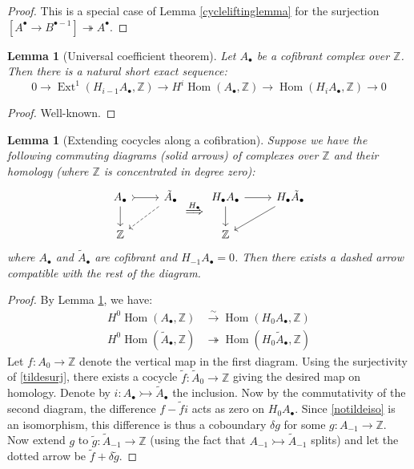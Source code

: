 \documentclass[12pt]{article}
\newtheorem{lemma}[theorem]{Lemma}
\theoremstyle{definition}
\theoremstyle{remark}
\numberwithin{equation}{subsection}
\newcommand{\ZZ}{\mathbb Z}
\newcommand{\Hom}{\operatorname{Hom}}
\newcommand{\Ext}{\operatorname{Ext}}
\begin{document}
\begin{proof}
This is a special case of Lemma \ref{cycleliftinglemma} for the surjection $[A^\bullet\to B^{\bullet-1}]\twoheadrightarrow A^\bullet$.
\end{proof}

\begin{lemma}[Universal coefficient theorem]\label{universalcoefficient}
Let $A_\bullet$ be a cofibrant complex over $\ZZ$.  Then there is a natural short exact sequence:
\begin{equation}
0\to\Ext^1(H_{i-1}A_\bullet,\ZZ)\to H^i\Hom(A_\bullet,\ZZ)\to\Hom(H_iA_\bullet,\ZZ)\to 0
\end{equation}
\end{lemma}

\begin{proof}
Well-known.
\end{proof}

\begin{lemma}[Extending cocycles along a cofibration]\label{cocycleextendinglemma}
Suppose we have the following commuting diagrams (solid arrows) of complexes over $\ZZ$ and their homology (where $\ZZ$ is concentrated in degree zero):
\begin{equation}
\begin{tikzcd}
A_\bullet\ar[tail]{r}\ar{d}&\tilde A_\bullet\ar[dashed]{dl}\\
\ZZ
\end{tikzcd}
\overset{H_\bullet}\Longrightarrow
\begin{tikzcd}
H_\bullet A_\bullet\ar{r}\ar{d}&H_\bullet\tilde A_\bullet\ar{dl}\\
\ZZ
\end{tikzcd}
\end{equation}
where $A_\bullet$ and $\tilde A_\bullet$ are cofibrant and $H_{-1}A_\bullet=0$.  Then there exists a dashed arrow compatible with the rest of the diagram.
\end{lemma}

\begin{proof}
By Lemma \ref{universalcoefficient}, we have:
\begin{align}
\label{notildeiso}H^0\Hom(A_\bullet,\ZZ)&\xrightarrow\sim\Hom(H_0A_\bullet,\ZZ)\\
\label{tildesurj}H^0\Hom(\tilde A_\bullet,\ZZ)&\twoheadrightarrow\Hom(H_0\tilde A_\bullet,\ZZ)
\end{align}
Let $f:A_0\to\ZZ$ denote the vertical map in the first diagram.  Using the surjectivity of \eqref{tildesurj}, there exists a cocycle $\tilde f:\tilde A_0\to\ZZ$ giving the desired map on homology.  Denote by $i:A_\bullet\rightarrowtail\tilde A_\bullet$ the inclusion.  Now by the commutativity of the second diagram, the difference $f-\tilde fi$ acts as zero on $H_0A_\bullet$.  Since \eqref{notildeiso} is an isomorphism, this difference is thus a coboundary $\delta g$ for some $g:A_{-1}\to\ZZ$.  Now extend $g$ to $\tilde g:\tilde A_{-1}\to\ZZ$ (using the fact that $A_{-1}\rightarrowtail\tilde A_{-1}$ splits) and let the dotted arrow be $\tilde f+\delta\tilde g$.
\end{proof}
\end{document}
